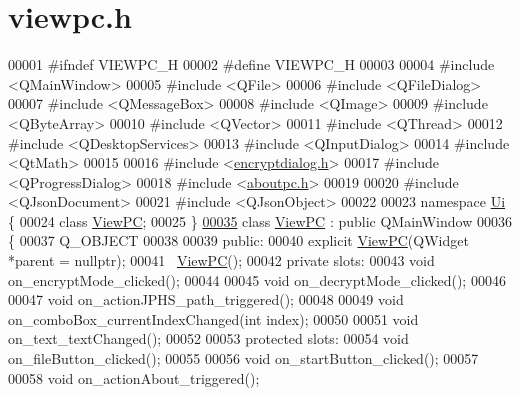 \hypertarget{viewpc_8h_source}{}\section{viewpc.\+h}

\begin{DoxyCode}
00001 \textcolor{preprocessor}{#ifndef VIEWPC\_H}
00002 \textcolor{preprocessor}{#define VIEWPC\_H}
00003 
00004 \textcolor{preprocessor}{#include <QMainWindow>}
00005 \textcolor{preprocessor}{#include <QFile>}
00006 \textcolor{preprocessor}{#include <QFileDialog>}
00007 \textcolor{preprocessor}{#include <QMessageBox>}
00008 \textcolor{preprocessor}{#include <QImage>}
00009 \textcolor{preprocessor}{#include <QByteArray>}
00010 \textcolor{preprocessor}{#include <QVector>}
00011 \textcolor{preprocessor}{#include <QThread>}
00012 \textcolor{preprocessor}{#include <QDesktopServices>}
00013 \textcolor{preprocessor}{#include <QInputDialog>}
00014 \textcolor{preprocessor}{#include <QtMath>}
00015 
00016 \textcolor{preprocessor}{#include <\hyperlink{encryptdialog_8h}{encryptdialog.h}>}
00017 \textcolor{preprocessor}{#include <QProgressDialog>}
00018 \textcolor{preprocessor}{#include <\hyperlink{aboutpc_8h}{aboutpc.h}>}
00019 
00020 \textcolor{preprocessor}{#include <QJsonDocument>}
00021 \textcolor{preprocessor}{#include <QJsonObject>}
00022 
00023 \textcolor{keyword}{namespace }\hyperlink{namespace_ui}{Ui} \{
00024 \textcolor{keyword}{class }\hyperlink{class_view_p_c}{ViewPC};
00025 \}
\hypertarget{viewpc_8h_source.tex_l00035}{}\hyperlink{class_view_p_c}{00035} \textcolor{keyword}{class }\hyperlink{class_view_p_c}{ViewPC} : \textcolor{keyword}{public} QMainWindow
00036 \{
00037     Q\_OBJECT
00038 
00039 \textcolor{keyword}{public}:
00040     \textcolor{keyword}{explicit} \hyperlink{class_view_p_c}{ViewPC}(QWidget *parent = \textcolor{keyword}{nullptr});
00041     ~\hyperlink{class_view_p_c}{ViewPC}();
00042 \textcolor{keyword}{private} slots:
00043     \textcolor{keywordtype}{void} on\_encryptMode\_clicked();
00044 
00045     \textcolor{keywordtype}{void} on\_decryptMode\_clicked();
00046 
00047     \textcolor{keywordtype}{void} on\_actionJPHS\_path\_triggered();
00048 
00049     \textcolor{keywordtype}{void} on\_comboBox\_currentIndexChanged(\textcolor{keywordtype}{int} index);
00050 
00051     \textcolor{keywordtype}{void} on\_text\_textChanged();
00052 
00053 \textcolor{keyword}{protected} slots:
00054     \textcolor{keywordtype}{void} on\_fileButton\_clicked();
00055 
00056     \textcolor{keywordtype}{void} on\_startButton\_clicked();
00057 
00058     \textcolor{keywordtype}{void} on\_actionAbout\_triggered();

\end{DoxyCode}
